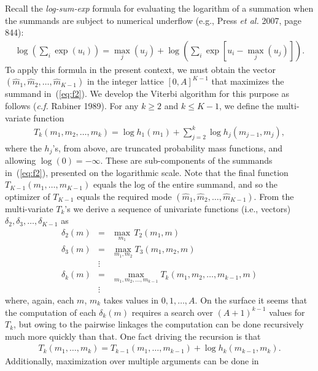 Recall the {\em log-sum-exp} formula for evaluating the logarithm
of a summation when
the summands are subject to numerical underflow (e.g., Press {\em et
 al.} 2007, page 844):
\begin{eqnarray*}
\log \left( \sum_i \exp(u_i) \right)   = \max_j (u_j) + \log\left( 
 \sum_i \exp[ u_i - \max_j (u_j) ] \right).
\end{eqnarray*}
To apply this formula in the present context, we must obtain the
vector $(\hat m_1, \hat m_2, \ldots, \hat m_{K-1})$ in the
integer lattice $[0,A]^{K-1}$
that maximizes the summand in~(\ref{eq:f2}).  We develop the Viterbi 
algorithm for this purpose as follows ({\em c.f.} Rabiner 1989).
For any $k \geq 2$ and $k \leq K-1$, we define the multi-variate function
\begin{eqnarray*}
T_k(m_1, m_2, \ldots, m_k ) = \log h_1(m_1)
 + \sum_{j=2}^{k} \log h_j( m_{j-1}, m_j ),
\end{eqnarray*}
where the $h_j$'s, from above, are truncated probability mass functions,
and allowing $\log(0) = -\infty $.  These are sub-components of
 the summands in~(\ref{eq:f2}), presented on the logarithmic scale.
Note that the final function
 $T_{K-1}(m_1, \ldots, m_{K-1})$ equals the log of the
entire summand, and so the optimizer of $T_{K-1}$ equals the
required mode $(\hat m_1, \hat m_2, \ldots, \hat m_{K-1})$.
From the multi-variate $T_k$'s we derive a sequence of univariate
functions (i.e., vectors) $\delta_2, \delta_3, \ldots, \delta_{K-1}$
as
\begin{eqnarray*}
 \delta_2(m) &=& \max_{m_1} \, T_2( m_1, m ) \\
 \delta_3(m) &=& \max_{m_1,m_2} T_3( m_1,m_2, m ) \\
  & \vdots & \\
 \delta_k(m) &=& \max_{m_1, m_2, \ldots, m_{k-1}} T_k( m_1, m_2, 
 \ldots , m_{k-1}, m ) \\
  & \vdots & 
\end{eqnarray*}
where, again, each $m$, $m_k$ takes values in $0, 1, \ldots, A$.
On the surface it seems that the computation of each $\delta_k(m)$
requires a search over $(A+1)^{k-1}$ values for $T_k$, but owing to
the pairwise linkages the computation can be done recursively much
more quickly than that. One fact driving the recursion is
that 
\begin{eqnarray*}
T_k( m_1, \ldots, m_k ) = T_{k-1}( m_1, \ldots, m_{k-1} )
   + \log h_k( m_{k-1}, m_k ).
\end{eqnarray*}
Additionally, maximization over multiple arguments can be done in
